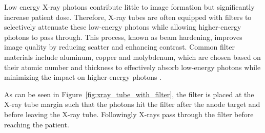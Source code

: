Low energy X-ray photons contribute little to image formation but significantly
increase patient dose. Therefore, X-ray tubes are often equipped with filters to
selectively attenuate these low-energy photons while allowing higher-energy
photons to pass through. This process, known as beam hardening, improves image
quality by reducing scatter and enhancing contrast. Common filter materials
include aluminum, copper and molybdenum, which are chosen based on their atomic
number and thickness to effectively absorb low-energy photons while minimizing
the impact on higher-energy photons \cite{poludniowski2022calculating}.

As can be seen in Figure~\ref{fig:xray_tube_with_filter}, the filter is placed
at the X-ray tube margin such that the photons hit the filter after the anode
target and before leaving the X-ray tube. Followingly X-rays pass through the
filter before reaching the patient.

